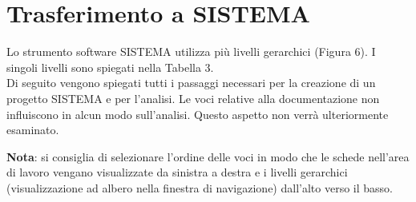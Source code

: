 \documentclass[a4paper,11pt]{article}
\begin{document}
    \section{Trasferimento a SISTEMA}
    \par\medskip\noindent Lo strumento software SISTEMA utilizza più livelli gerarchici (Figura 6). I singoli livelli sono spiegati nella Tabella 3.\\
    Di seguito vengono spiegati tutti i passaggi necessari per la creazione di un progetto SISTEMA e per l'analisi. Le voci relative alla documentazione non influiscono in alcun modo sull'analisi. Questo aspetto non verrà ulteriormente esaminato.\\
    \par\medskip\noindent \textbf{Nota}: si consiglia di selezionare l'ordine delle voci in modo che le schede nell'area di lavoro vengano visualizzate da sinistra a destra e i livelli gerarchici (visualizzazione ad albero nella finestra di navigazione) dall'alto verso il basso.
\end{document}
